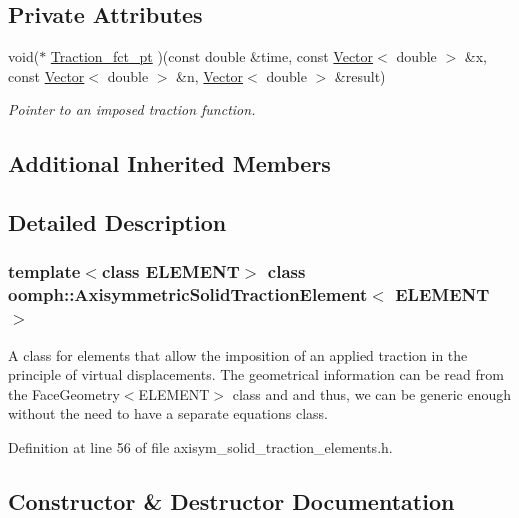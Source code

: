 \subsection*{Private Attributes}
\begin{DoxyCompactItemize}
\item 
void($\ast$ \hyperlink{classoomph_1_1AxisymmetricSolidTractionElement_af81e4c31c910c253faeeba17f1070000}{Traction\+\_\+fct\+\_\+pt} )(const double \&time, const \hyperlink{classoomph_1_1Vector}{Vector}$<$ double $>$ \&x, const \hyperlink{classoomph_1_1Vector}{Vector}$<$ double $>$ \&n, \hyperlink{classoomph_1_1Vector}{Vector}$<$ double $>$ \&result)
\begin{DoxyCompactList}\small\item\em Pointer to an imposed traction function. \end{DoxyCompactList}\end{DoxyCompactItemize}
\subsection*{Additional Inherited Members}


\subsection{Detailed Description}
\subsubsection*{template$<$class E\+L\+E\+M\+E\+NT$>$\newline
class oomph\+::\+Axisymmetric\+Solid\+Traction\+Element$<$ E\+L\+E\+M\+E\+N\+T $>$}

A class for elements that allow the imposition of an applied traction in the principle of virtual displacements. The geometrical information can be read from the Face\+Geometry$<$\+E\+L\+E\+M\+E\+N\+T$>$ class and and thus, we can be generic enough without the need to have a separate equations class. 

Definition at line 56 of file axisym\+\_\+solid\+\_\+traction\+\_\+elements.\+h.



\subsection{Constructor \& Destructor Documentation}
\mbox{\label{classoomph_1_1AxisymmetricSolidTractionElement_add2978a434bca4d36ca2dc5ec0107ff9}} 
